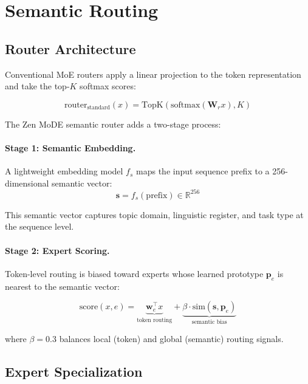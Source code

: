 \documentclass[11pt,a4paper]{article}
\begin{document}
\section{Semantic Routing}

\subsection{Router Architecture}

Conventional MoE routers apply a linear projection to the token representation and take the top-$K$ softmax scores:

\begin{equation}
\text{router}_{\text{standard}}(x) = \text{TopK}(\text{softmax}(\mathbf{W}_r x), K)
\end{equation}

The Zen MoDE semantic router adds a two-stage process:

\paragraph{Stage 1: Semantic Embedding.} A lightweight embedding model $f_s$ maps the input sequence prefix to a 256-dimensional semantic vector:
\begin{equation}
\mathbf{s} = f_s(\text{prefix}) \in \mathbb{R}^{256}
\end{equation}

This semantic vector captures topic domain, linguistic register, and task type at the sequence level.

\paragraph{Stage 2: Expert Scoring.} Token-level routing is biased toward experts whose learned prototype $\mathbf{p}_e$ is nearest to the semantic vector:

\begin{equation}
\text{score}(x, e) = \underbrace{\mathbf{w}_e^\top x}_{\text{token routing}} + \underbrace{\beta \cdot \text{sim}(\mathbf{s}, \mathbf{p}_e)}_{\text{semantic bias}}
\end{equation}

where $\beta = 0.3$ balances local (token) and global (semantic) routing signals.

\subsection{Expert Specialization}
\end{document}
